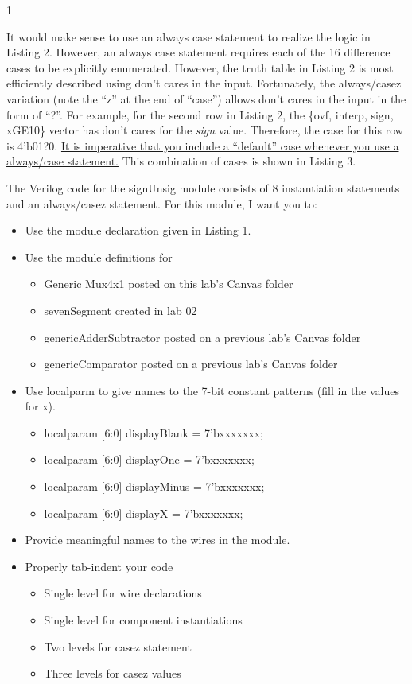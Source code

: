1

It would make sense to use an always case statement to realize the logic
in Listing 2. However, an always case statement requires each of the 16
difference cases to be explicitly enumerated. However, the truth table
in Listing 2 is most efficiently described using don't cares in the
input. Fortunately, the always/casez variation (note the ``z'' at the
end of ``case'') allows don't cares in the input in the form of ``?''.
For example, for the second row in Listing 2, the \{ovf, interp, sign,
xGE10\} vector has don't cares for the \emph{sign} value. Therefore, the
case for this row is 4'b01?0. \uline{It is imperative that you include a
``default'' case whenever you use a always/case statement.} This
combination of cases is shown in Listing 3.

\protect\hypertarget{sigUnsign_Verilog}{}{}The Verilog code for the
signUnsig module consists of 8 instantiation statements and an
always/casez statement. For this module, I want you to:

\begin{itemize}
\item
  Use the module declaration given in Listing 1.
\item
  Use the module definitions for

  \begin{itemize}
  \item
    Generic Mux4x1 posted on this lab's Canvas folder
  \item
    sevenSegment created in lab 02
  \item
    genericAdderSubtractor posted on a previous lab's Canvas folder
  \item
    genericComparator posted on a previous lab's Canvas folder
  \end{itemize}
\item
  Use localparm to give names to the 7-bit constant patterns (fill in
  the values for x).

  \begin{itemize}
  \item
    localparam {[}6:0{]} displayBlank = 7'bxxxxxxx;
  \item
    localparam {[}6:0{]} displayOne = 7'bxxxxxxx;
  \item
    localparam {[}6:0{]} displayMinus = 7'bxxxxxxx;
  \item
    localparam {[}6:0{]} displayX = 7'bxxxxxxx;
  \end{itemize}
\item
  Provide meaningful names to the wires in the module.
\item
  Properly tab-indent your code

  \begin{itemize}
  \item
    Single level for wire declarations
  \item
    Single level for component instantiations
  \item
    Two levels for casez statement
  \item
    Three levels for casez values
  \end{itemize}
\end{itemize}

